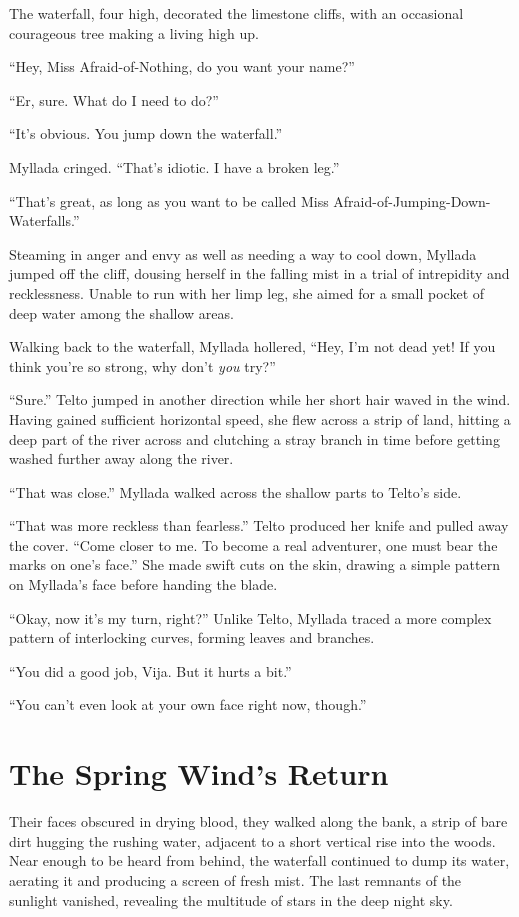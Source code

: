 The waterfall, four \vetyn high, decorated the limestone cliffs, with an occasional courageous tree making a living high up.

``Hey, Miss Afraid-of-Nothing, do you want your name?''

``Er, sure. What do I need to do?''

``It's obvious. You jump down the waterfall.''

Myllada cringed. ``That's idiotic. I have a broken leg.''

``That's great, as long as you want to be called Miss Afraid-of-Jumping-Down-Waterfalls.''

Steaming in anger and envy as well as needing a way to cool down, Myllada jumped off the cliff, dousing herself in the falling mist in a trial of intrepidity and recklessness. Unable to run with her limp leg, she aimed for a small pocket of deep water among the shallow areas.

Walking back to the waterfall, Myllada hollered, ``Hey, I'm not dead yet! If you think you're so strong, why don't \emph{you} try?''

``Sure.'' Telto jumped in another direction while her short hair waved in the wind. Having gained sufficient horizontal speed, she flew across a strip of land, hitting a deep part of the river across and clutching a stray branch in time before getting washed further away along the river.

``That was close.'' Myllada walked across the shallow parts to Telto's side.

``That was more reckless than fearless.'' Telto produced her knife and pulled away the cover. ``Come closer to me. To become a real adventurer, one must bear the marks on one's face.'' She made swift cuts on the skin, drawing a simple pattern on Myllada's face before handing the blade.

``Okay, now it's my turn, right?'' Unlike Telto, Myllada traced a more complex pattern of interlocking curves, forming leaves and branches.

``You did a good job, Vija. But it hurts a bit.''

``You can't even look at your own face right now, though.''

\chapter{The Spring Wind's Return}

Their faces obscured in drying blood, they walked along the bank, a strip of bare dirt hugging the rushing water, adjacent to a short vertical rise into the woods. Near enough to be heard from behind, the waterfall continued to dump its water, aerating it and producing a screen of fresh mist. The last remnants of the sunlight vanished, revealing the multitude of stars in the deep night sky.

